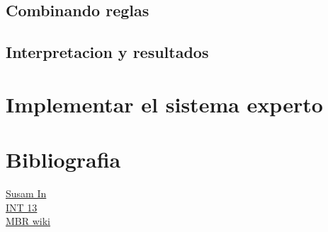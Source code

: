 \documentclass[11pt,oneside,a4paper]{article}
\begin{document}
\subsection{Combinando reglas}



\subsection{Interpretacion y resultados}

\section{Implementar el sistema experto}

\section*{Bibliografia}


\href{http://susam.in/articles/boot-sector-code/}{Susam In}\\
\href{http://www.pelletiernet.com/helppc/int_13-2.html}{INT 13}\\
\href{http://en.wikipedia.org/wiki/Master_boot_record}{MBR wiki}
\end{document}
